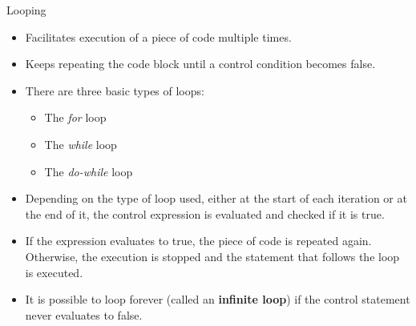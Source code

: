 \documentclass[aspectratio=169]{beamer}
\begin{document}
\begin{frame}[fragile]{Looping}
    \begin{itemize}
        \item Facilitates execution of a piece of code multiple times.
        \item Keeps repeating the code block until a control condition becomes false.
        \item There are three basic types of loops:
        \begin{itemize}
            \item The \textit{for} loop
            \item The \textit{while} loop
            \item The \textit{do-while} loop
        \end{itemize}
        \item Depending on the type of loop used, either at the start of each iteration or at the end of it, the control expression is evaluated and checked if it is true.
        \item If the expression evaluates to true, the piece of code is repeated again. Otherwise, the execution is stopped and the statement that follows the loop is executed.
        \item It is possible to loop forever (called an \textbf{infinite loop}) if the control statement never evaluates to false.
    \end{itemize}
\end{frame}
\end{document}
